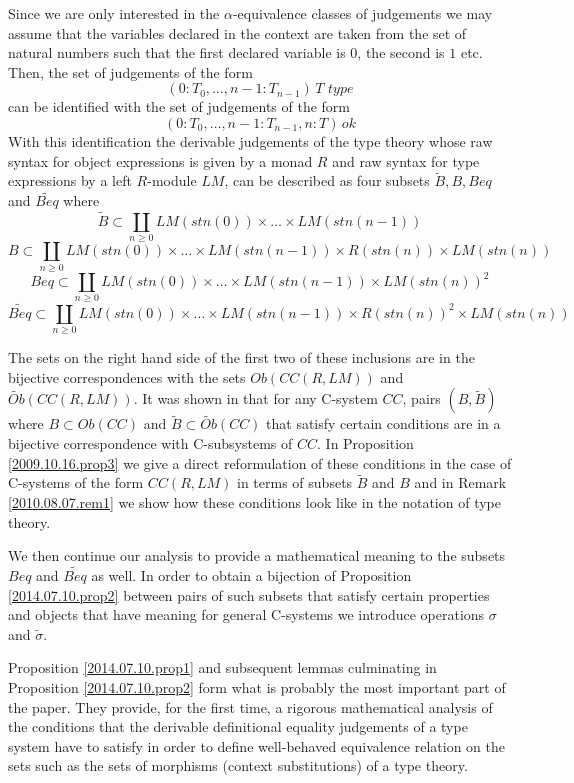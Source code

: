 \documentclass[11pt]{article}
\newcommand{\wt}{\widetilde}
\begin{document}
Since we are only interested in the $\alpha$-equivalence classes of judgements we may assume that the variables declared in the context are taken from the set of natural numbers such that the first declared variable is $0$, the second is $1$ etc.  Then, the set of judgements of the form 
%
$$(0:T_0,\dots,{n-1}:T_{n-1})\,T\,\,type$$
%
can be identified with the set of judgements of the form 
%
$$(0:T_0,\dots,{n-1}:T_{n-1}, n:T)\,ok$$
%
With this identification the derivable judgements of the type theory whose raw syntax for object expressions is given by a monad $R$ and raw syntax for type expressions by a left $R$-module $LM$, can be described as four subsets ${\wt{B}},{B},{Beq}$ and ${\wt{Beq}}$ where 
%
$${\wt{B}} \subset \coprod_{n\ge 0} LM({stn(0)})\times\dots\times LM({stn(n-1)})$$
$${B}\subset  \coprod_{n\ge 0} LM({stn(0)})\times\dots\times LM({stn(n-1)})\times R({stn(n)})\times LM({stn(n)})$$
$${Beq} \subset \coprod_{n\ge 0} LM({stn(0)})\times\dots\times LM({stn(n-1)})\times LM({stn(n)})^2$$
$${\wt{Beq}} \subset \coprod_{n\ge 0} LM({stn(0)})\times\dots\times LM({stn(n-1)})\times R({stn(n)})^2\times LM({stn(n)})$$ 
%

The sets on the right hand side of the first two of these inclusions are in the bijective correspondences with the sets $Ob(CC(R,LM))$ and $\wt{Ob}(CC(R,LM))$. It was shown in \cite[Proposition 4.3]{Csubsystems} that for any C-system $CC$, pairs $(B,\wt{B})$ where $B\subset Ob(CC)$ and $\wt{B}\subset \wt{Ob}(CC)$ that satisfy certain conditions are in a bijective correspondence with C-subsystems of $CC$. In Proposition \ref{2009.10.16.prop3} we give a direct reformulation of these conditions in the case of C-systems of the form $CC(R,LM)$ in terms of subsets ${\wt{B}}$ and ${B}$ and in Remark \ref{2010.08.07.rem1} we show how these conditions look like in the notation of type theory. 

We then continue our analysis to provide a mathematical meaning to the subsets ${Beq}$ and ${\wt{Beq}}$ as well. In order to obtain a bijection of Proposition \ref{2014.07.10.prop2} between pairs of such subsets that satisfy certain properties and objects that have meaning for general C-systems we introduce operations $\sigma$ and $\wt{\sigma}$. 

Proposition \ref{2014.07.10.prop1} and subsequent lemmas culminating in Proposition \ref{2014.07.10.prop2} form what is probably the most important part of the paper. They provide, for the first time, a rigorous mathematical analysis of the conditions that the derivable definitional equality judgements of a type system have to satisfy in order to define well-behaved equivalence relation on the sets such as the sets of morphisms (context substitutions) of a type theory. 
\end{document}
